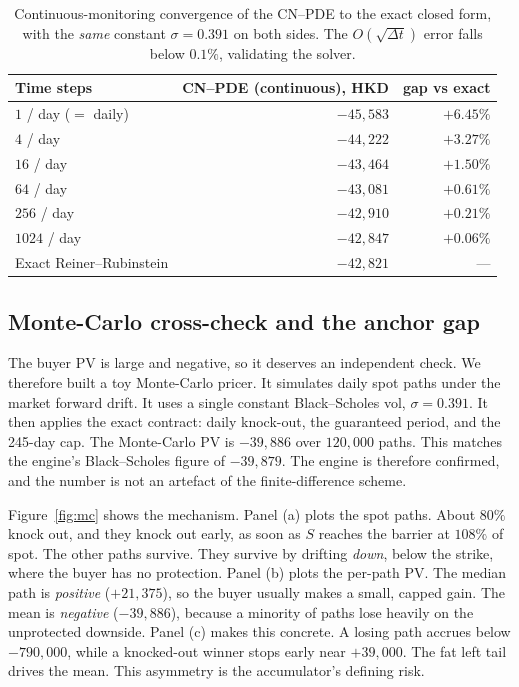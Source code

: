 \documentclass[11pt]{article}
\begin{document}
\begin{table}[h]\centering\small
\begin{tabular}{@{}lrr@{}}
\toprule
Time steps & CN--PDE (continuous), HKD & gap vs exact \\
\midrule
$1$ / day ($=$ daily)    & $-45{,}583$ & $+6.45\%$ \\
$4$ / day                & $-44{,}222$ & $+3.27\%$ \\
$16$ / day               & $-43{,}464$ & $+1.50\%$ \\
$64$ / day               & $-43{,}081$ & $+0.61\%$ \\
$256$ / day              & $-42{,}910$ & $+0.21\%$ \\
$1024$ / day             & $-42{,}847$ & $+0.06\%$ \\
\midrule
Exact Reiner--Rubinstein & $-42{,}821$ & --- \\
\bottomrule
\end{tabular}
\caption{Continuous-monitoring convergence of the CN--PDE to the exact closed form, with the
\emph{same} constant $\sigma=0.391$ on both sides. The $O(\sqrt{\Delta t})$ error falls below
$0.1\%$, validating the solver.}
\label{tab:validation}
\end{table}

\subsection{Monte-Carlo cross-check and the anchor gap}
The buyer PV is large and negative, so it deserves an independent check. We therefore built a toy
Monte-Carlo pricer. It simulates daily spot paths under the market forward drift. It uses a single
constant Black--Scholes vol, $\sigma=0.391$. It then applies the exact contract: daily knock-out, the
guaranteed period, and the 245-day cap. The Monte-Carlo PV is $-39{,}886$ over $120{,}000$ paths.
This matches the engine's Black--Scholes figure of $-39{,}879$. The engine is therefore confirmed,
and the number is not an artefact of the finite-difference scheme.

Figure~\ref{fig:mc} shows the mechanism. Panel (a) plots the spot paths. About $80\%$ knock out, and
they knock out early, as soon as $S$ reaches the barrier at $108\%$ of spot. The other paths survive.
They survive by drifting \emph{down}, below the strike, where the buyer has no protection. Panel (b)
plots the per-path PV. The median path is \emph{positive} ($+21{,}375$), so the buyer usually makes a
small, capped gain. The mean is \emph{negative} ($-39{,}886$), because a minority of paths lose
heavily on the unprotected downside. Panel (c) makes this concrete. A losing path accrues below
$-790{,}000$, while a knocked-out winner stops early near $+39{,}000$. The fat left tail drives the
mean. This asymmetry is the accumulator's defining risk.
\end{document}
